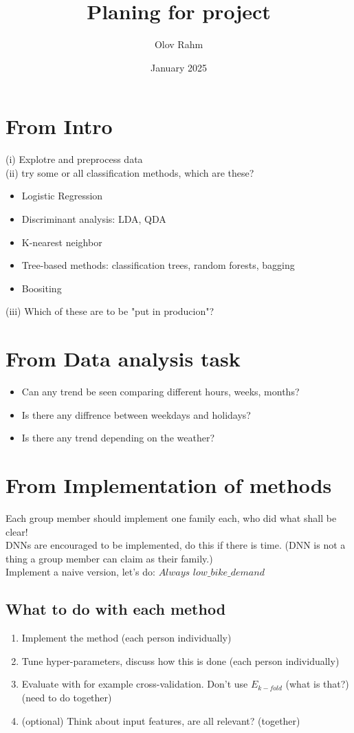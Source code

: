 \documentclass{article}
\title{Planing for project}
\author{Olov Rahm}
\date{January 2025}
\begin{document}
\maketitle
\section{From Intro}
\noindent
(i) Explotre and preprocess data
\\
(ii) try some or all classification methods, which are these?
\begin{itemize}
    \item Logistic Regression
    \item Discriminant analysis: LDA, QDA
    \item K-nearest neighbor
    \item Tree-based methods: classification trees, random forests, bagging
    \item Boositing
\end{itemize}
(iii) Which of these are to be "put in producion"?

\section{From Data analysis task}
\begin{itemize}
    \item Can any trend be seen comparing different hours, weeks, months?
    \item Is there any diffrence between weekdays and holidays?
    \item Is there any trend depending on the weather?
\end{itemize}

\section{From Implementation of methods}

Each group member should implement one family each, who did what shall be clear!
\\
DNNs are encouraged to be implemented, do this if there is time. 
(DNN is not a thing a group member can claim as their family.)
\\
Implement a naive version, let's do: $\textit{Always low\_bike\_demand}$
\subsection{What to do with each method}
\begin{enumerate}
    \item Implement the method (each person individually)
    \item Tune hyper-parameters, discuss how this is done (each person individually)
    \item Evaluate with for example cross-validation. Don't use $E_{k-fold}$ (what is that?) (need to do together)
    \item (optional) Think about input features, are all relevant? (together)
\end{enumerate}
\end{document}
